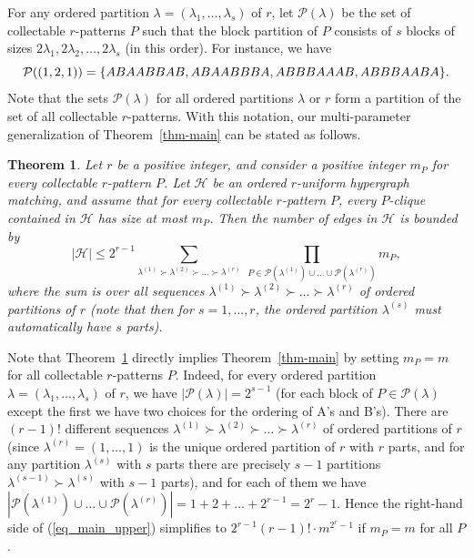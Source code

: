 \documentclass[11pt]{article}
\newtheorem{theorem}{Theorem}[section]
\theoremstyle{definition}
\numberwithin{equation}{section}
\numberwithin{figure}{section}
\newcommand{\HH}{\mathcal{H}}
\newcommand{\PP}{\mathcal{P}}
\begin{document}
For any ordered partition $\lambda=(\lambda_1,\dots,\lambda_s)$ of $r$, let $\PP(\lambda)$ be the set of collectable $r$-patterns $P$ such that the block partition of $P$ consists of $s$ blocks of sizes $2\lambda_1,2\lambda_2,\dots,2\lambda_s$ (in this order). For instance, we have 
\[
\PP((1,2,1)) = \{\rm{ABAABBAB, ABAABBBA, ABBBAAAB, ABBBAABA}\}.
\]
Note that the sets $\PP(\lambda)$ for all ordered partitions $\lambda$ or $r$ form a partition of the set of all collectable $r$-patterns.
With this notation, our multi-parameter generalization of Theorem~\ref{thm-main} can be stated as follows. 

\begin{theorem} \label{thm-paramteters-upper-bound}
Let $r$ be a positive integer, and consider a positive integer $m_P$ for every collectable $r$-pattern $P$. Let $\HH$ be an ordered $r$-uniform hypergraph matching, and assume that for every collectable $r$-pattern $P$, every $P$-clique contained in $\HH$ has size at most $m_P$. Then the number of edges in $\HH$ is bounded by
\begin{equation}\label{eq_main_upper}
|\HH|\le 2^{r-1} \sum_{\lambda^{(1)} \succ \lambda^{(2)} \succ \dots \succ \lambda^{(r)}}\ \prod_{P\in \PP(\lambda^{(1)})\cup\dots\cup \PP(\lambda^{(r)})} m_{P},
\end{equation}
where the sum is over all sequences $\lambda^{(1)} \succ \lambda^{(2)} \succ \dots \succ \lambda^{(r)}$ of ordered partitions of $r$ (note that then for $s=1,\dots,r$, the ordered partition $\lambda^{(s)}$ must automatically have $s$ parts).
\end{theorem}

Note that Theorem~\ref{thm-paramteters-upper-bound} directly implies Theorem~\ref{thm-main} by setting $m_P=m$ for all collectable $r$-patterns $P$. Indeed, for every ordered partition $\lambda=(\lambda_1,\dots,\lambda_s)$ of $r$, we have $|\PP(\lambda)|=2^{s-1}$ (for each block of $P \in \PP(\lambda)$ except the first we have two choices for the ordering of A's and B's). There are $(r-1)!$ different sequences $\lambda^{(1)} \succ \lambda^{(2)} \succ \dots \succ \lambda^{(r)}$ of ordered partitions of $r$ (since $\lambda^{(r)}=(1,\dots,1)$ is the unique ordered partition of $r$ with $r$ parts, and for any partition $\lambda^{(s)}$ with $s$ parts there are precisely $s-1$ partitions $\lambda^{(s-1)} \succ \lambda^{(s)}$ with $s-1$ parts), and for each of them we have $|\PP(\lambda^{(1)})\cup\dots\cup \PP(\lambda^{(r)})|=1+2+\dots+2^{r-1}=2^r-1$. Hence the right-hand side of (\ref{eq_main_upper}) simplifies to $2^{r-1}(r-1)!\cdot m^{2^r-1}$ if $m_P=m$ for all $P$.
\end{document}
